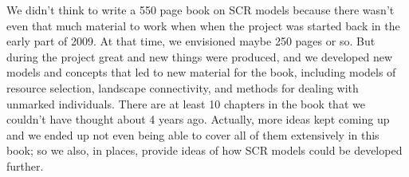 \begin{itemize}
We didn't think to write a 550 page book on SCR models because there
wasn't even that much material to work when when the project was
started back in the early part of 2009. At that time, we envisioned
maybe 250 pages or so. But during the project great and new things
were produced, and we developed new models and concepts that led to
new material for the book, including models of resource selection,
landscape connectivity, and methods for dealing with unmarked
individuals. There are at least 10 chapters in the book that we
couldn't have thought about 4 years ago. Actually, more ideas kept
coming up and we ended up not even being able to cover all of them
extensively in this book; so we also, in places, provide ideas of how
SCR models could be developed further.


\begin{comment}
\section*{Where did we go wrong?}

The latex \mbox{\tt ~} is about useless as tits on a boar.

Ok, there will be some obvious, even embarrasing, problems that arise
once the book hits the street. Those are unintnentional. Besides
those, there are some deficiencies with the book that we can identify
{\it before} the book hits the street. For one thing, it's a little
bit long-winded. We added some introductory/background material that
covers more than 100 pages. We don't really get to SCR models until
around page 130.  So you have some reading to do, or else skip over
it, or whatever. Our intent was to provide all of the material you
need in one place. When you start outlinging or enumerating the
``requirements'' and you flesh each of those out a little bit, then
you have basically a short chapter on what you need to know in order
to get through SCR models. But then that short chapter is just
referencing a bunch of other material and so you start fleshing it out
a little bit more, and the next thing you know you have 3 chapters of
background content that amounts to 100 or more pages.  So, there you
have it.

As a second thing, we're tying together data analysis, R scripts, and
BUGS code from 4 different developers and we find, every day, certain
inconsistencies with notation and so on. We hope to have that all
nailed down in the final, edited, version of the book. But some of the
R package material will appear inconsistent with the book because the
package is dynamic, but the book is static. Or, in some cases, the
package development is lagging the printed book page. (this should
soon be fixed!).




\end{comment}
\end{itemize}
